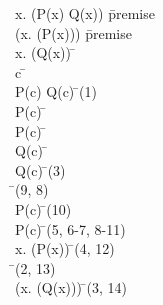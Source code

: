 \documentclass{article}
\begin{document}
\begin{proofbox}
\: \forall x. (P(x) \lor Q(x)) \= \hbox{premise} \\
\: \lnot (\forall x. (P(x))) \= \hbox{premise} \\
\open
\: \forall x. (\lnot Q(x)) \= \asm \\
\open
\: c \= \forallintroconst \\
\: P(c) \lor Q(c) \= \forallelim(1) \\
\openAlt
\: P(c) \= \asm \\
\: P(c) \=  \\
\splitAlt
\: Q(c) \= \asm \\
\: \lnot Q(c) \= \forallelim(3) \\
\: \bot \= \notelim(9, 8) \\
\: P(c) \= \bottomelim(10) \\
\closeAlt
\: P(c) \= \orelim(5, 6-7, 8-11) \\
\close
\: \forall x. (P(x)) \= \forallintro(4, 12) \\
\: \bot \= \notelim(2, 13) \\
\close
\: \lnot (\forall x. (\lnot Q(x))) \= \notintro(3, 14) \\
\end{proofbox}
\end{document}
